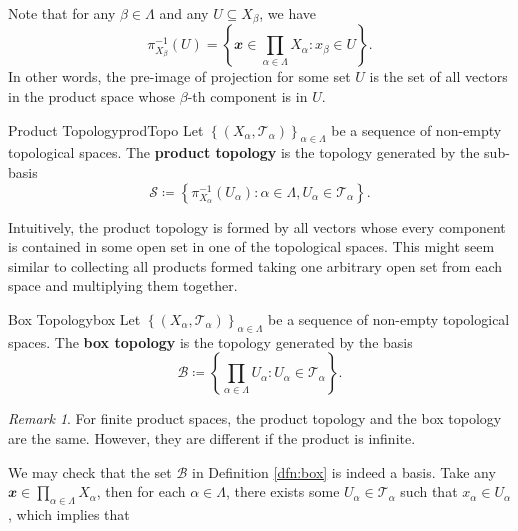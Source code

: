 \documentclass[math]{amznotes}
\theoremstyle{remark}
\newtheorem*{remark}{Remark}
\begin{document}
Note that for any $\beta \in \Lambda$ and any $U \subseteq X_{\beta}$, we have
\begin{equation*}
    \pi_{X_{\beta}}^{-1}\left(U\right) = \left\{\mathbfit{x} \in \prod_{\alpha \in \Lambda}X_{\alpha} \colon x_{\beta} \in U\right\}.
\end{equation*}
In other words, the pre-image of projection for some set $U$ is the set of all vectors in the product space whose $\beta$-th component is in $U$.
\begin{dfnbox}{Product Topology}{prodTopo}
    Let $\left\{\left(X_{\alpha}, \mathcal{T}_{\alpha}\right)\right\}_{\alpha \in \Lambda}$ be a sequence of non-empty topological spaces. The {\color{red} \textbf{product topology}} is the topology generated by the sub-basis 
    \begin{equation*}
        \mathcal{S} \coloneqq \left\{\pi_{X_{\alpha}}^{-1}\left(U_{\alpha}\right) \colon \alpha \in \Lambda, U_{\alpha} \in \mathcal{T}_{\alpha}\right\}.
    \end{equation*}
\end{dfnbox}
Intuitively, the product topology is formed by all vectors whose every component is contained in some open set in one of the topological spaces. This might seem similar to collecting all products formed taking one arbitrary open set from each space and multiplying them together.
\begin{dfnbox}{Box Topology}{box}
    Let $\left\{\left(X_{\alpha}, \mathcal{T}_{\alpha}\right)\right\}_{\alpha \in \Lambda}$ be a sequence of non-empty topological spaces. The {\color{red} \textbf{box topology}} is the topology generated by the basis 
    \begin{equation*}
        \mathcal{B} \coloneqq \left\{\prod_{\alpha \in \Lambda}U_{\alpha} \colon U_{\alpha} \in \mathcal{T}_{\alpha}\right\}.
    \end{equation*}
\end{dfnbox}
\begin{notebox}
    \begin{remark}
        For finite product spaces, the product topology and the box topology are the same. However, they are different if the product is infinite.
    \end{remark}
\end{notebox}
We may check that the set $\mathcal{B}$ in Definition \ref{dfn:box} is indeed a basis. Take any $\mathbfit{x} \in \prod_{\alpha \in \Lambda}X_{\alpha}$, then for each $\alpha \in \Lambda$, there exists some $U_{\alpha} \in \mathcal{T}_{\alpha}$ such that $x_{\alpha} \in U_{\alpha}$, which implies that 
\end{document}

